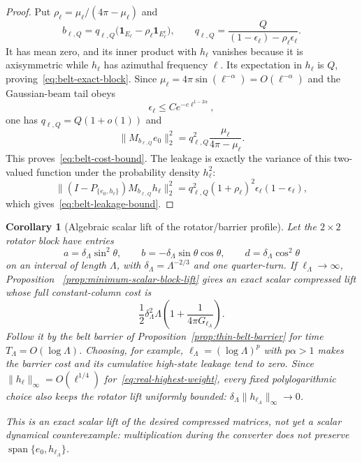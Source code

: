 \documentclass[11pt]{article}
\newtheorem{corollary}[theorem]{Corollary}
\theoremstyle{definition}
\theoremstyle{remark}
\begin{document}
\begin{proof}
Put $\rho_\ell=\mu_\ell/(4\pi-\mu_\ell)$ and
\begin{equation}
 b_{\ell,Q}
 =q_{\ell,Q}\bigl(\mathbf1_{E_\ell}
 -\rho_\ell\mathbf1_{E_\ell^c}\bigr),
 \qquad
 q_{\ell,Q}
 =\frac{Q}{(1-\epsilon_\ell)-\rho_\ell\epsilon_\ell}.
 \label{eq:belt-potential}
\end{equation}
It has mean zero, and its inner product with $h_\ell$ vanishes because it is
axisymmetric while $h_\ell$ has azimuthal frequency $\ell$.  Its expectation
in $h_\ell$ is $Q$, proving~\eqref{eq:belt-exact-block}.  Since
$\mu_\ell=4\pi\sin(\ell^{-\alpha})=O(\ell^{-\alpha})$ and the Gaussian-beam
tail obeys
\begin{equation}
 \epsilon_\ell\leq Ce^{-c\ell^{1-2\alpha}},
\end{equation}
one has $q_{\ell,Q}=Q(1+o(1))$ and
\begin{equation}
 \|M_{b_{\ell,Q}}e_0\|_2^2
 =q_{\ell,Q}^2\frac{\mu_\ell}{4\pi-\mu_\ell}.
\end{equation}
This proves~\eqref{eq:belt-cost-bound}.  The leakage is exactly the variance
of this two-valued function under the probability density $h_\ell^2$:
\begin{equation}
 \|(I-P_{\{e_0,h_\ell\}})M_{b_{\ell,Q}}h_\ell\|_2^2
 =q_{\ell,Q}^2(1+\rho_\ell)^2
 \epsilon_\ell(1-\epsilon_\ell),
\end{equation}
which gives~\eqref{eq:belt-leakage-bound}.
\end{proof}

\begin{corollary}[Algebraic scalar lift of the rotator/barrier profile]
\label{cor:scalar-rotator-barrier-lift}
Let the $2\times2$ rotator block have entries
\begin{equation}
 a=\delta_\Lambda\sin^2\theta,\qquad
 b=-\delta_\Lambda\sin\theta\cos\theta,\qquad
 d=\delta_\Lambda\cos^2\theta
\end{equation}
on an interval of length $\Lambda$, with
$\delta_\Lambda=\Lambda^{-2/3}$ and one quarter-turn.  If
$\ell_\Lambda\to\infty$, Proposition
~\ref{prop:minimum-scalar-block-lift} gives an exact scalar compressed lift
whose full constant-column cost is
\begin{equation}
 \frac12\delta_\Lambda^2\Lambda
 \left(1+\frac1{4\pi G_{\ell_\Lambda}}\right).
 \label{eq:scalar-lifted-rotator-cost}
\end{equation}
Follow it by the belt barrier of Proposition~\ref{prop:thin-belt-barrier} for
time $T_\Lambda=O(\log\Lambda)$.  Choosing, for example,
$\ell_\Lambda=(\log\Lambda)^p$ with $p\alpha>1$ makes the barrier cost and its
cumulative high-state leakage tend to zero.  Since
$\|h_\ell\|_\infty=O(\ell^{1/4})$ for~\eqref{eq:real-highest-weight}, every
fixed polylogarithmic choice also keeps the rotator lift uniformly bounded:
$\delta_\Lambda\|h_{\ell_\Lambda}\|_\infty\to0$.

This is an exact scalar lift of the desired compressed matrices, not yet a
scalar dynamical counterexample: multiplication during the converter does not
preserve $\operatorname{span}\{e_0,h_{\ell_\Lambda}\}$.
\end{corollary}
\end{document}
